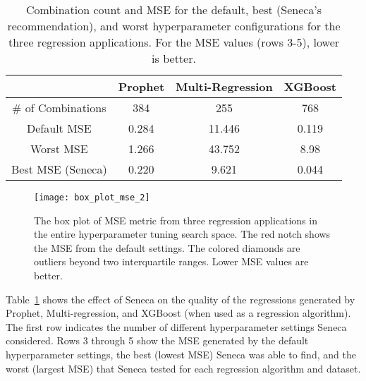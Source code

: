 \begin{table}
\centering
\begin{tabular}{|c|c|c|c|}
\hline
& Prophet & Multi-Regression & XGBoost\\
\hline
\# of Combinations & 384 & 255 & 768\\
\hline
\hline
Default MSE & 0.284 & 11.446 & 0.119 \\
\hline
Worst MSE & 1.266 & 43.752 & 8.98 \\
\hline
Best MSE (Seneca) & 0.220 & 9.621 & 0.044 \\
\hline
\end{tabular}
\caption{Combination count and MSE for the default, best (Seneca's recommendation), and worst hyperparameter configurations for the three regression applications. 
For the MSE  values (rows 3-5), lower is better.
\label{tab:mse}}
\vspace{-0.2in}
\end{table}

\begin{figure}[t] \centering 
\vspace{-0.2in}
\texttt{[image: box\_plot\_mse\_2]}
\vspace{-0.4in}
\caption{The box plot of MSE metric from three regression applications in the entire hyperparameter tuning search space. The red notch shows the MSE from the default settings. The colored diamonds are outliers beyond two interquartile ranges. Lower MSE values are better.
\label{fig:box_plot_mse}}
\vspace{-0.2in}
\end{figure}

Table~\ref{tab:mse} shows the effect of Seneca on the quality of the
regressions generated by Prophet, Multi-regression, and XGBoost (when used as
a regression algorithm). The first row indicates the number of
different hyperparameter settings Seneca considered.  Rows 3 through 5 show
the MSE generated by the default hyperparameter settings, the best (lowest
MSE) Seneca was able to find, and the worst (largest MSE) that Seneca tested
for each regression algorithm and dataset.

%

